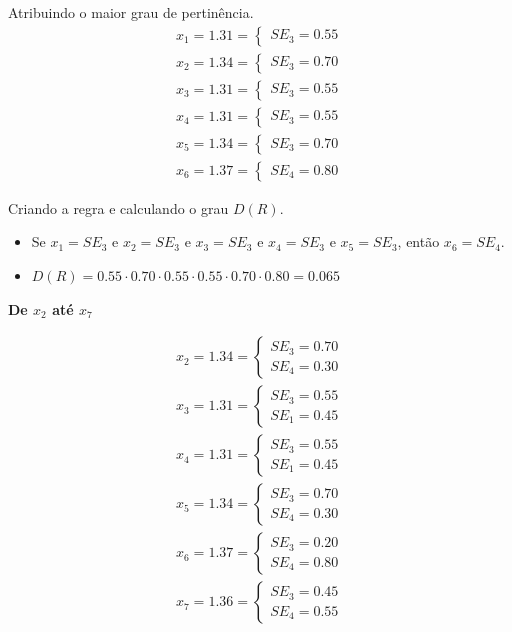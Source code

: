 \documentclass[12pt]{article}
\begin{document}
Atribuindo o maior grau de pertinência.
\begin{align*}
	x_1=1.31=\begin{cases}
		SE_3=0.55
	\end{cases}\\
	x_2=1.34=\begin{cases}
		SE_3=0.70
	\end{cases}\\
	x_3=1.31=\begin{cases}
		SE_3=0.55
	\end{cases}\\
	x_4=1.31=\begin{cases}
		SE_3=0.55
	\end{cases}\\
	x_5=1.34=\begin{cases}
		SE_3=0.70
	\end{cases}\\
	x_6=1.37=\begin{cases}
		SE_4=0.80
	\end{cases}
\end{align*}

Criando a regra e calculando o grau $D(R)$.
\begin{itemize}
	\item Se $x_1=SE_3$ e $x_2=SE_3$ e $x_3=SE_3$ e $x_4=SE_3$ e $x_5=SE_3$, então $x_6=SE_4$.
	\item $D(R)=0.55\cdot0.70\cdot0.55\cdot0.55\cdot0.70\cdot0.80=0.065$
\end{itemize}

\textbf{De $x_2$ até $x_7$}

\begin{align*}
	x_2=1.34=\begin{cases}
		SE_3=0.70\\SE_4=0.30
	\end{cases}\\
	x_3=1.31=\begin{cases}
		SE_3=0.55\\SE_1=0.45
	\end{cases}\\
	x_4=1.31=\begin{cases}
		SE_3=0.55\\SE_1=0.45
	\end{cases}\\
	x_5=1.34=\begin{cases}
		SE_3=0.70\\SE_4=0.30
	\end{cases}\\
	x_6=1.37=\begin{cases}
		SE_3=0.20\\SE_4=0.80
	\end{cases}\\
	x_7=1.36=\begin{cases}
		SE_3=0.45\\SE_4=0.55
	\end{cases}
\end{align*}
\end{document}
